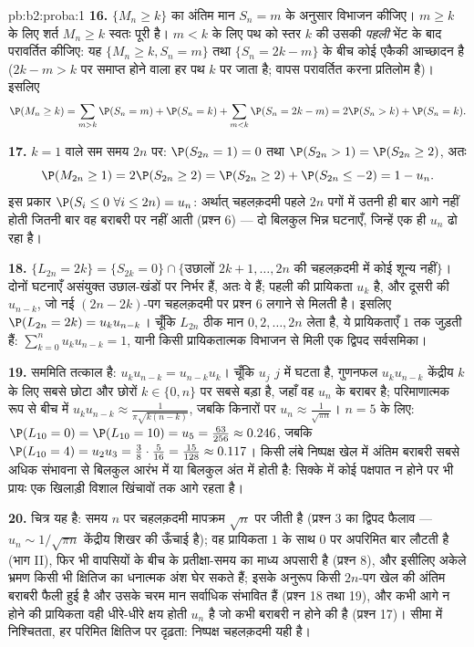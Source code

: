 \begin{solution}{pb:b2:proba:1}
\textbf{16.} $\{M_n \geq k\}$ का अंतिम मान $S_n = m$ के अनुसार विभाजन कीजिए। $m \geq k$ के
लिए शर्त $M_n \geq k$ स्वतः पूरी है। $m < k$ के लिए पथ को स्तर $k$ की उसकी
\emph{पहली} भेंट के बाद परावर्तित कीजिए: यह $\{M_n \geq k, S_n = m\}$ तथा $\{S_n = 2k - m\}$ के बीच कोई
एकैकी आच्छादन है ($2k - m > k$ पर समाप्त होने वाला हर पथ $k$ पर जाता है;
वापस परावर्तित करना प्रतिलोम है)। इसलिए
\[
\P(M_n \geq k)
= \sum_{m > k}\P(S_n = m) + \P(S_n = k)
+ \sum_{m < k}\P(S_n = 2k - m)
= 2\P(S_n > k) + \P(S_n = k).
\]

\textbf{17.} $k = 1$ वाले सम समय $2n$ पर: $\P(S_{2n} = 1)
= 0$ तथा $\P(S_{2n} > 1) = \P(S_{2n} \geq 2)$, अतः
\[
\P(M_{2n} \geq 1) = 2\P(S_{2n} \geq 2)
= \P(S_{2n} \geq 2) + \P(S_{2n} \leq -2)
= 1 - u_n .
\]
इस प्रकार $\P(S_i \leq 0\ \forall i \leq 2n) = u_n$: अर्थात् चहलक़दमी पहले $2n$ पगों में उतनी ही बार आगे
नहीं होती जितनी बार वह बराबरी पर नहीं आती (प्रश्न 6) --- दो
बिलकुल भिन्न घटनाएँ, जिन्हें एक ही $u_n$ ढो रहा है।

\textbf{18.} $\{L_{2n} = 2k\} = \{S_{2k} = 0\} \cap
\{\text{उछालों } 2k+1, \dots, 2n \text{ की चहलक़दमी में कोई शून्य
नहीं}\}$। दोनों घटनाएँ असंयुक्त उछाल-खंडों पर निर्भर हैं, अतः
वे  हैं; पहली की प्रायिकता $u_k$ है, और दूसरी की $u_{n-k}$, जो
नई $(2n-2k)$-पग चहलक़दमी पर प्रश्न 6 लगाने से मिलती है। इसलिए $\P(L_{2n} = 2k) = u_ku_{n-k}$।
चूँकि $L_{2n}$ ठीक मान $0, 2, \dots, 2n$ लेता है, ये प्रायिकताएँ $1$ तक जुड़ती हैं:
$\sum_{k=0}^nu_ku_{n-k} = 1$, यानी किसी प्रायिकतात्मक विभाजन से मिली एक द्विपद सर्वसमिका।

\textbf{19.} सममिति तत्काल है: $u_ku_{n-k} =
u_{n-k}u_k$। चूँकि $u_j$ $j$ में घटता है,
गुणनफल $u_ku_{n-k}$ केंद्रीय $k$ के लिए सबसे छोटा और छोरों $k \in \{0, n\}$ पर सबसे
बड़ा है, जहाँ वह $u_n$ के बराबर है; परिमाणात्मक रूप से बीच में $u_ku_{n-k} \approx \frac1{\pi\sqrt{k(n-k)}}$,
जबकि किनारों पर $u_n \approx \frac1{\sqrt{\pi n}}$। $n = 5$ के लिए: $\P(L_{10} = 0) = \P(L_{10} = 10) =
u_5 = \frac{63}{256} \approx 0.246$, जबकि $\P(L_{10} = 4) =
u_2u_3 = \frac38\cdot\frac5{16} = \frac{15}{128} \approx
0.117$। किसी लंबे
निष्पक्ष खेल में अंतिम बराबरी सबसे अधिक संभावना से बिलकुल आरंभ में
या बिलकुल अंत में होती है: सिक्के में कोई पक्षपात न होने पर भी
प्रायः एक खिलाड़ी विशाल खिंचावों तक आगे रहता है।

\textbf{20.} चित्र यह है: समय $n$ पर चहलक़दमी मापक्रम $\sqrt n$ पर जीती
है (प्रश्न 3 का द्विपद फैलाव --- $u_n \sim
1/\sqrt{\pi n}$ केंद्रीय शिखर की ऊँचाई है);
वह प्रायिकता $1$ के साथ $0$ पर अपरिमित बार लौटती है (भाग II), फिर
भी वापसियों के बीच के प्रतीक्षा-समय का माध्य अपसारी है (प्रश्न 8),
और इसीलिए अकेले भ्रमण किसी भी क्षितिज का धनात्मक अंश घेर सकते हैं;
इसके अनुरूप किसी $2n$-पग खेल की अंतिम बराबरी फैली हुई है और उसके
चरम मान सर्वाधिक संभावित हैं (प्रश्न 18 तथा 19), और कभी आगे न होने
की प्रायिकता वही धीरे-धीरे क्षय होती $u_n$ है जो कभी बराबरी न होने
की है (प्रश्न 17)। सीमा में निश्चितता, हर परिमित क्षितिज पर दृढ़ता:
निष्पक्ष चहलक़दमी यही है।


\end{solution}
